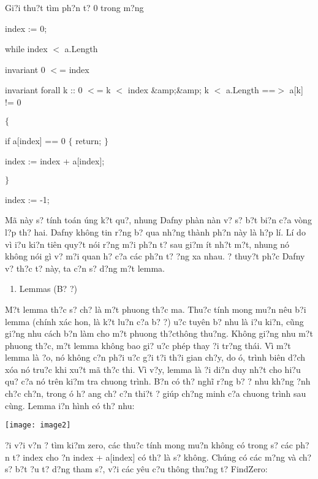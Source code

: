 \documentclass{article} %
\begin{document}
\noindent Gi?i thu?t t\`{i}m ph?n t? 0 trong m?ng

\noindent index := 0;

\noindent    while index $<$ a.Length

\noindent       invariant 0 $<$= index

\noindent       invariant forall k :: 0 $<$= k $<$ index \&amp;\&amp; k $<$ a.Length ==$>$ a[k] != 0

\noindent    $\{$

\noindent       if a[index] == 0 $\{$ return; $\}$

\noindent       index := index + a[index];

\noindent    $\}$

\noindent    index := -1;

M\~{a} n\`{a}y s? t\'{i}nh to\'{a}n {\dj}\'{u}ng k?t qu?, nhung Dafny ph\`{a}n n\`{a}n v? s? b?t bi?n c?a v\`{o}ng l?p th? hai. Dafny kh\^{o}ng tin r?ng b? qua nh?ng th\`{a}nh ph?n n\`{a}y l\`{a} h?p l\'{i}. L\'{i} do v\`{i} {\dj}i?u ki?n ti\^{e}n quy?t n\'{o}i r?ng m?i ph?n t? sau gi?m \'{i}t nh?t m?t, nhung n\'{o} kh\^{o}ng n\'{o}i g\`{i} v? m?i quan h? c?a c\'{a}c ph?n t? {\dj}?ng xa nhau. {\DJ}? thuy?t ph?c Dafny v? th?c t? n\`{a}y, ta c?n s? d?ng m?t lemma.

\begin{enumerate}
\item  Lemmas (B? {\dj}?)
\end{enumerate}

M?t lemma th?c s? ch? l\`{a} m?t phuong th?c ma. Thu?c t\'{i}nh mong mu?n n\^{e}u b?i lemma (ch\'{i}nh x\'{a}c hon, l\`{a} k?t lu?n c?a b? {\dj}?) {\dj}u?c tuy\^{e}n b? nhu l\`{a} {\dj}i?u ki?n, c\~{u}ng gi?ng nhu c\'{a}ch b?n l\`{a}m cho m?t phuong th?cth\^{o}ng thu?ng. Kh\^{o}ng gi?ng nhu m?t phuong th?c, m?t lemma kh\^{o}ng bao gi? {\dj}u?c ph\'{e}p thay {\dj}?i tr?ng th\'{a}i. V\`{i} m?t lemma l\`{a} ?o, n\'{o} kh\^{o}ng c?n ph?i {\dj}u?c g?i t?i th?i gian ch?y, do {\dj}\'{o}, tr\`{i}nh bi\^{e}n d?ch x\'{o}a n\'{o} tru?c khi xu?t m\~{a} th?c thi. V\`{i} v?y, lemma l\`{a} {\dj}?i di?n duy nh?t cho hi?u qu? c?a n\'{o} tr\^{e}n ki?m tra chuong tr\`{i}nh. B?n c\'{o} th? ngh\~{i} r?ng b? {\dj}? nhu kh?ng {\dj}?nh ch?c ch?n, trong {\dj}\'{o} h? {\dj}ang ch? c?n thi?t {\dj}? gi\'{u}p ch?ng minh c?a chuong tr\`{i}nh sau c\`{u}ng. Lemma {\dj}i?n h\`{i}nh c\'{o} th? nhu:

\noindent \texttt{[image: image2]}

{\DJ}?i v?i v?n {\dj}? t\`{i}m ki?m zero, c\'{a}c thu?c t\'{i}nh mong mu?n kh\^{o}ng c\'{o} trong s? c\'{a}c ph?n t? index cho {\dj}?n index + a[index] c\'{o} th? l\`{a} s? kh\^{o}ng. Ch\'{u}ng c\'{o} c\'{a}c m?ng v\`{a} ch? s? b?t {\dj}?u t? d?ng tham s?, v?i c\'{a}c y\^{e}u c?u th\^{o}ng thu?ng t? FindZero:
\end{document}
